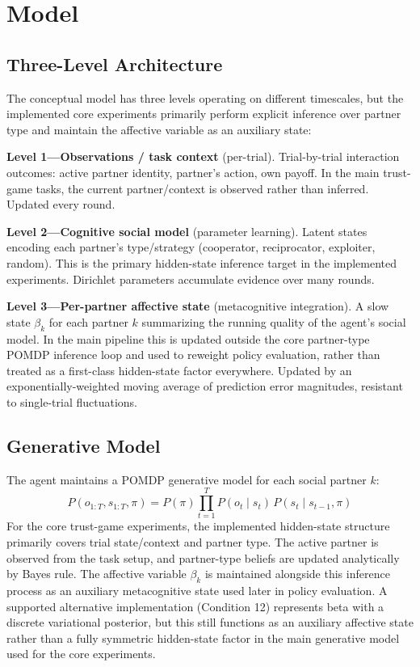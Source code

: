 \documentclass[11pt,a4paper]{article}
\begin{document}
\section{Model}
\label{sec:model}

\subsection{Three-Level Architecture}

The conceptual model has three levels operating on different timescales, but the implemented core experiments primarily perform explicit inference over partner type and maintain the affective variable as an auxiliary state:

\textbf{Level 1---Observations / task context} (per-trial). Trial-by-trial interaction outcomes: active partner identity, partner's action, own payoff. In the main trust-game tasks, the current partner/context is observed rather than inferred. Updated every round.

\textbf{Level 2---Cognitive social model} (parameter learning). Latent states encoding each partner's type/strategy (cooperator, reciprocator, exploiter, random). This is the primary hidden-state inference target in the implemented experiments. Dirichlet parameters accumulate evidence over many rounds.

\textbf{Level 3---Per-partner affective state} (metacognitive integration). A slow state $\beta_k$ for each partner $k$ summarizing the running quality of the agent's social model. In the main pipeline this is updated outside the core partner-type POMDP inference loop and used to reweight policy evaluation, rather than treated as a first-class hidden-state factor everywhere. Updated by an exponentially-weighted moving average of prediction error magnitudes, resistant to single-trial fluctuations.

\subsection{Generative Model}

The agent maintains a POMDP generative model for each social partner $k$:
\begin{equation}
  P(o_{1:T}, s_{1:T}, \pi) = P(\pi) \prod_{t=1}^{T} P(o_t \mid s_t)\, P(s_t \mid s_{t-1}, \pi)
\end{equation}
For the core trust-game experiments, the implemented hidden-state structure primarily covers trial state/context and partner type. The active partner is observed from the task setup, and partner-type beliefs are updated analytically by Bayes rule. The affective variable $\beta_k$ is maintained alongside this inference process as an auxiliary metacognitive state used later in policy evaluation. A supported alternative implementation (Condition 12) represents beta with a discrete variational posterior, but this still functions as an auxiliary affective state rather than a fully symmetric hidden-state factor in the main generative model used for the core experiments.
\end{document}
